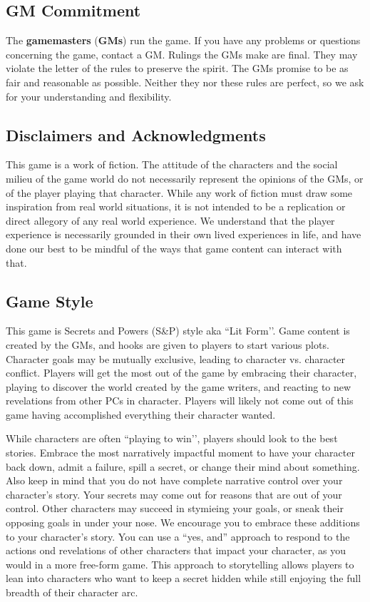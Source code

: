 \documentclass[sheet]{GL2020}
\begin{document}
\subsection{GM Commitment}
The \textbf{gamemasters} (\textbf{GMs}) run the game. If you have any problems or questions concerning the game, contact a GM. Rulings the GMs make are final.  They may violate the letter of the rules to preserve the spirit.  The GMs promise to be as fair and reasonable as possible. Neither they nor these rules are perfect, so we ask for your understanding and flexibility.

\subsection{Disclaimers and Acknowledgments}
This game is a work of fiction. The attitude of the characters and the social milieu of the game world do not necessarily represent the opinions of the GMs, or of the player playing that character. While any work of fiction must draw some inspiration from real world situations, it is not intended to be a replication or direct allegory of any real world experience. We understand that the player experience is necessarily grounded in their own lived experiences in life, and have done our best to be mindful of the ways that game content can interact with that. %

\subsection{Game Style}
This game is Secrets and Powers (S\&P) style aka ``Lit Form’’. Game content is created by the GMs, and hooks are given to players to start various plots. Character goals may be mutually exclusive, leading to character vs. character conflict. Players will get the most out of the game by embracing their character, playing to discover the world created by the game writers, and reacting to new revelations from other PCs in character. Players will likely not come out of this game having accomplished everything their character wanted.

While characters are often ``playing to win’’, players should look to the best stories. Embrace the most narratively impactful moment to have your character back down, admit a failure, spill a secret, or change their mind about something. Also keep in mind that you do not have complete narrative control over your character’s story. Your secrets may come out for reasons that are out of your control. Other characters may succeed in stymieing your goals, or sneak their opposing goals in under your nose. We encourage you to embrace these additions to your character’s story. You can use a ``yes, and'' approach to respond to the actions ond revelations of other characters that impact your character, as you would in a more free-form game. This approach to storytelling allows players to lean into characters who want to keep a secret hidden while still enjoying the full breadth of their character arc.
\end{document}
